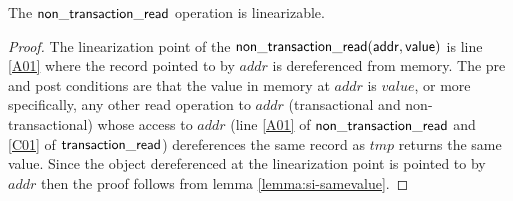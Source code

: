 \begin{lemma}
\label{lemma:si-ntread}
The $\sf{non\_transaction\_read}$ operation is linearizable.
\end{lemma}
\begin{proof}
The linearization point of the $\sf{non\_transaction\_read}(addr, value)$ is line \ref{A01} where the record
pointed to by $\mathit{addr}$ is dereferenced from memory.
The pre and post conditions are that the value in memory at $\mathit{addr}$ is $\mathit{value}$, or more specifically, 
any other read operation to $\mathit{addr}$ (transactional and non-transactional) whose access to $\mathit{addr}$
(line \ref{A01} of $\sf{non\_transaction\_read}$ and \ref{C01} of $\sf{transaction\_read}$) dereferences
the same record as $\mathit{tmp}$ returns the same value.
Since the object dereferenced at the linearization point is pointed to by $\mathit{addr}$ then the proof follows from
lemma \ref{lemma:si-samevalue}.
\end{proof}



